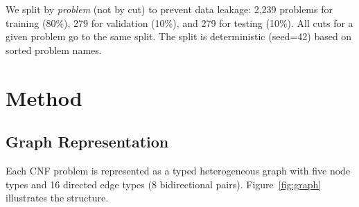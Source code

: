 \documentclass{article}
\begin{document}
We split by \emph{problem} (not by cut) to prevent data leakage:
2,239 problems for training (80\%), 279 for validation (10\%), and 279 for
testing (10\%). All cuts for a given problem go to the same split. The split
is deterministic (seed=42) based on sorted problem names.

\section{Method}
\label{sec:method}

\subsection{Graph Representation}
\label{sec:graph}

Each CNF problem is represented as a typed heterogeneous graph with five node types
and 16 directed edge types (8 bidirectional pairs). Figure~\ref{fig:graph} illustrates
the structure.
\end{document}

